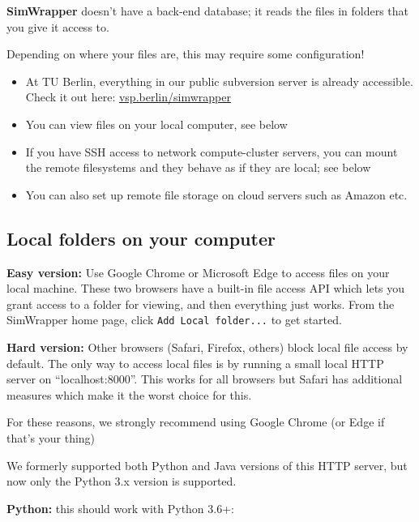 \textbf{SimWrapper} doesn't have a back-end database; it reads the files
in folders that you give it access to.

Depending on where your files are, this may require some configuration!

\begin{itemize}
\tightlist
\item
  At TU Berlin, everything in our public subversion server is already
  accessible. Check it out here:
  \href{https://vsp.berlin/simwrapper}{vsp.berlin/simwrapper}
\item
  You can view files on your local computer, see below
\item
  If you have SSH access to network compute-cluster servers, you can
  mount the remote filesystems and they behave as if they are local; see
  below
\item
  You can also set up remote file storage on cloud servers such as
  Amazon etc.
\end{itemize}

\hypertarget{local-folders-on-your-computer}{%
\subsection{Local folders on your
computer}\label{local-folders-on-your-computer}}

\textbf{Easy version:} Use Google Chrome or Microsoft Edge to access
files on your local machine. These two browsers have a built-in file
access API which lets you grant access to a folder for viewing, and then
everything just works. From the SimWrapper home page, click
\texttt{Add\ Local\ folder...} to get started.

\noindent\textbf{Hard version:} Other browsers (Safari, Firefox, others) block
local file access by default. The only way to access local files is by
running a small local HTTP server on ``localhost:8000''. This works for
all browsers but Safari has additional measures which make it the worst
choice for this.

For these reasons, we strongly recommend using Google Chrome (or Edge if
that's your thing)

We formerly supported both Python and Java versions of this HTTP server,
but now only the Python 3.x version is supported.

\textbf{Python:} this should work with Python 3.6+:

